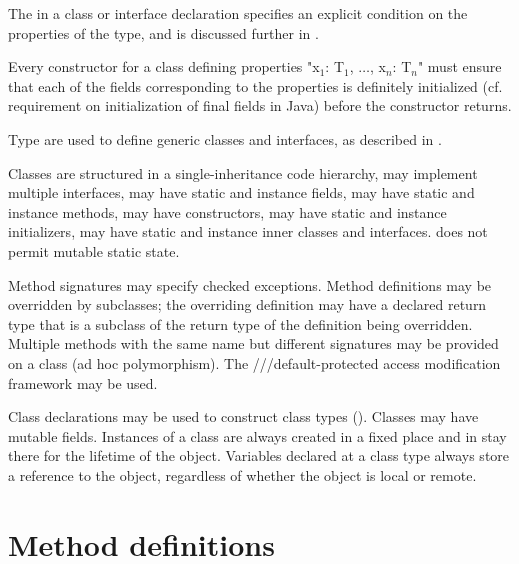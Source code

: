 \label{ClassGuard}

The  in a class or interface declaration specifies an
explicit condition on the properties of the type, and is discussed further
in .

\begin{staticrule*}
     Every constructor for a class defining
   properties \xcdmath"x$_1$: T$_1$, $\ldots$, x$_n$: T$_n$" must ensure that each of the fields
   corresponding to the properties is definitely initialized
   (cf. requirement on initialization of final fields in Java) before the
   constructor returns.
\end{staticrule*}

Type \params{} are used to define generic classes and
interfaces, as described in .

Classes are structured in a single-inheritance code
hierarchy, may implement multiple interfaces, may have static and
instance fields, may have static and instance methods, may have
constructors, may have static and instance initializers, may have
static and instance inner classes and interfaces. \Xten{} does not
permit mutable static state.

Method signatures may specify checked exceptions. Method definitions
may be overridden by subclasses; the overriding definition may have a
declared return type that is a subclass of the return type of the
definition being overridden. Multiple methods with the same name but
different signatures may be provided on a class (ad hoc
polymorphism). The ///default-protected access
modification framework may be used.



\label{ReferenceClasses}

Class declarations may
be used to construct class types (). Classes may
have mutable fields. Instances of a class are always created in a
fixed place and in \XtenCurrVer{} stay there for the lifetime of the
object.  Variables declared at a class type always store a reference
to the object, regardless of whether the object is local or remote.


\section{Method definitions}

